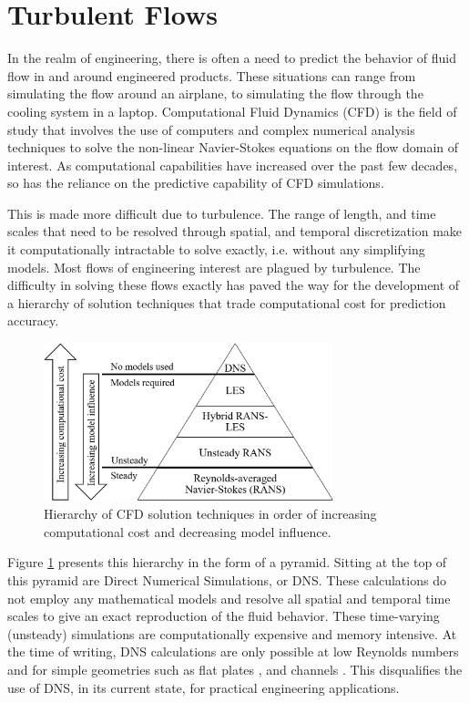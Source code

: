 \section{Turbulent Flows}

In the realm of engineering, there is often a need to predict the behavior of fluid flow in and around engineered products.
These situations can range from simulating the flow around an airplane, to simulating the flow through the cooling system in a laptop.
Computational Fluid Dynamics (CFD) is the field of study that involves the use of computers and complex numerical analysis techniques to solve the non-linear Navier-Stokes equations on the flow domain of interest.
As computational capabilities have increased over the past few decades, so has the reliance on the predictive capability of CFD simulations. 

This is made more difficult due to turbulence.
The range of length, and time scales that need to be resolved through spatial, and temporal discretization make it computationally intractable to solve exactly, i.e. without any simplifying models.
Most flows of engineering interest are plagued by turbulence.
The difficulty in solving these flows exactly has paved the way for the development of a hierarchy of solution techniques that trade computational cost for prediction accuracy. 

\begin{figure}
    \center
    \includegraphics[width=0.75\textwidth]{suthesis/images/solution_heirarchy_simple.png}
    \caption{Hierarchy of CFD solution techniques in order of increasing computational cost and decreasing model influence. \label{fig:cfd_types}}
\end{figure}

Figure \ref{fig:cfd_types} presents this hierarchy in the form of a pyramid.
Sitting at the top of this pyramid are Direct Numerical Simulations, or DNS.
These calculations do not employ any mathematical models and resolve all spatial and temporal time scales to give an exact reproduction of the fluid behavior.
These time-varying (unsteady) simulations are computationally expensive and memory intensive.
At the time of writing, DNS calculations are only possible at low Reynolds numbers and for simple geometries such as flat plates \cite{hoyas_reynolds_2008}, and channels \cite{laval_marquillie_dns_channel,marquillie_instability_2011}.
This disqualifies the use of DNS, in its current state, for practical engineering applications. 

